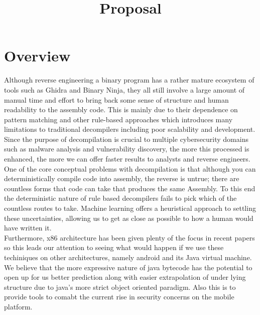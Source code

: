 \documentclass{article}
\author{}
\title{Proposal}
\begin{document}
	\maketitle

\section{Overview}
Although reverse engineering a binary program has a rather mature ecosystem of tools such as Ghidra and Binary Ninja, they all still involve a large amount of manual time and effort to bring back some sense of structure and human readability to the assembly code.
This is mainly due to their dependence on pattern matching and other rule-based approaches which introduces many limitations to traditional decompilers including poor scalability and development.
Since the purpose of decompilation is crucial to multiple cybersecurity domains such as malware analysis and vulnerability discovery, the more this processed is enhanced, the more we can offer faster results to analysts and reverse engineers. \\

\noindent One of the core conceptual problems with decompilation is that although you can deterministically compile code into assembly, the reverse is untrue; there are countless forms that code can take that produces the same Assembly.
To this end the deterministic nature of rule based decompilers fails to pick which of the countless routes to take.
Machine learning offers a heuristical approach to settling these uncertainties, allowing us to get as close as possible to how a human would have written it. \\

\noindent Furthermore, x86 architecture has been given plenty of the focus in recent papers so this leads our attention to seeing what would happen if we use these techiniques on other architectures, namely android and its Java virtual machine.
We believe that the more expressive nature of java bytecode has the potential to open up for us better prediction along with easier extrapolation of under lying structure due to java's more strict object oriented paradigm.
Also this is to provide tools to comabt the current rise in security concerns on the mobile platform. \\
\end{document}
